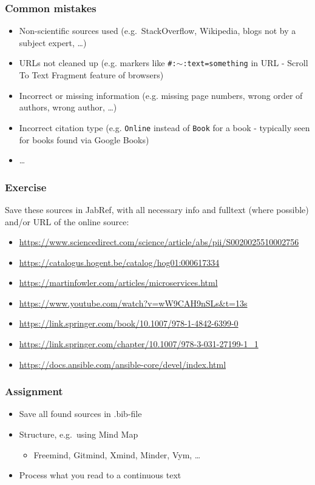 \documentclass[aspectratio=169]{beamer}
\begin{document}
\begin{frame}
  \frametitle{Common mistakes}

  \begin{itemize}
    \item Non-scientific sources used (e.g.\ StackOverflow, Wikipedia, blogs not by a subject expert, \ldots)
    \item URLs not cleaned up (e.g. markers like \texttt{\#:$\sim$:text=something} in URL - Scroll To Text Fragment feature of browsers)
    \item Incorrect or missing information (e.g. missing page numbers, wrong order of authors, wrong author, \ldots)
    \item Incorrect citation type (e.g. \texttt{Online} instead of \texttt{Book} for a book - typically seen for books found via Google Books)
    \item \ldots
  \end{itemize}
\end{frame}

\begin{frame}[plain]
  \frametitle{Exercise}

  Save these sources in JabRef, with all necessary info and fulltext (where possible) and/or URL of the online source:

  \bigskip

  \begin{itemize}
    \item \url{https://www.sciencedirect.com/science/article/abs/pii/S0020025510002756}
    \item \url{https://catalogus.hogent.be/catalog/hog01:000617334}
    \item \url{https://martinfowler.com/articles/microservices.html}
    \item \url{https://www.youtube.com/watch?v=wW9CAH9nSLs&t=13s}
    \item \url{https://link.springer.com/book/10.1007/978-1-4842-6399-0}
    \item \url{https://link.springer.com/chapter/10.1007/978-3-031-27199-1_1}
    \item \url{https://docs.ansible.com/ansible-core/devel/index.html}
  \end{itemize}

\end{frame}

\begin{frame}
  \frametitle{Assignment}

  \begin{itemize}
    \item Save all found sources in .bib-file
    \item Structure, e.g.\ using Mind Map
          \begin{itemize}
            \item Freemind, Gitmind, Xmind, Minder, Vym, \ldots
          \end{itemize}
    \item Process what you read to a continuous text
  \end{itemize}

  \bigskip

\end{frame}
\end{document}
